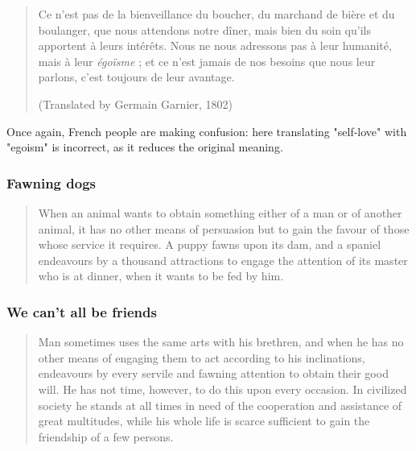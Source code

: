             \begin{quote}
                Ce n’est pas de la bienveillance du boucher, du marchand de bière et du boulanger, que nous attendons notre dîner, mais bien du soin qu’ils apportent à leurs intérêts. Nous ne nous adressons pas à leur humanité, mais à leur \textit{égoïsme} ; et ce n’est jamais de nos besoins que nous leur parlons, c’est toujours de leur avantage.

                (Translated by Germain Garnier, 1802)
            \end{quote}

            \begin{remark}
                Once again, French people are making confusion: here translating "self-love" with "egoism" is incorrect, as it reduces the original meaning.
            \end{remark}

        \subsubsection{Fawning dogs}

            \begin{quote}
                When an animal wants to obtain something either of a man or of another animal, it has no other means of persuasion but to gain the favour of those whose service it requires. A puppy fawns upon its dam, and a spaniel endeavours by a thousand attractions to engage the attention of its master who is at dinner, when it wants to be fed by him.
            \end{quote}

        \subsubsection{We can’t all be friends}

            \begin{quote}
                Man sometimes uses the same arts with his brethren, and when he has no other means of engaging them to act according to his inclinations, endeavours by every servile and fawning attention to obtain their good will. He has not time, however, to do this upon every occasion. In civilized society he stands at all times in need of the cooperation and assistance of great multitudes, while his whole life is scarce sufficient to gain the friendship of a few persons.
            \end{quote}

